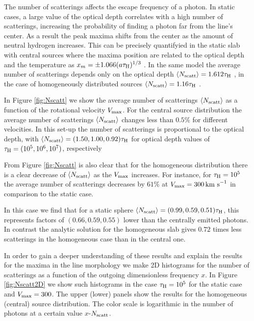 \documentclass{emulateapj}
\newcommand{\ly}{{\ifmmode{{\rm Ly}\alpha~}\else{Ly$\alpha$~}\fi}}
\newcommand{\kms}{{\ifmmode{{\mathrm{\,km\ s}^{-1}}}\else{\,km~s$^{-1}$}\fi}}
\begin{document}
The number of scatterings affects the escape frequency of a \ly photon.
In static cases, a large value of the optical depth correlates with a
high number of scatterings, increasing the probability of finding a
\ly photon far from the line's center. As a result the peak maxima
shifts from the center as the amount of neutral hydrogen
increases. This can be precisely quantifyied in the static slab
with central sources where the maxima position are related to
the optical depth and the temperature as $x_{m}=\pm 1.066(a\tau_{\rm
  H})^{1/3}$ \citep{Harrington73}. In the same model the average
number of scatterings depends only on the optical depth $\langle
N_{\rm  scatt}\rangle=1.612\tau_{\rm   H}$
\citep{Adams72,Harrington73}, in the case of homogeneously distributed
sources $\langle N_{\rm   scatt}\rangle=1.16\tau_{\rm   H}$
\citep{Harrington73}.   



In Figure \ref{fig:Nscatt} we show the average number of scatterings
$\langle N_{\rm scatt}\rangle$ as a function of the rotational velocity
$V_{\rm max}$. For the central source distribution the average number of
scatterings $\langle N_{\rm   scatt}\rangle$ changes less than $0.5\%$
for different velocities. In this set-up the number of scatterings is
proportional to the optical depth, with $\langle N_{\rm
  scatt}\rangle= (1.50, 1.00, 0.92)\tau_{\rm   H}$ for optical depth
values of $\tau_{\rm H} = (10^{5}, 10^{6}, 10^{7})$, respectively


From Figure \ref{fig:Nscatt} is also clear that for the homogeneous
distribution there is a clear decrease of $\langle N_{\rm
  scatt}\rangle$ as the $V_{\rm max}$ increases. For instance, for
$\tau_{\rm H}=10^5$ the average number of scatterings decreases by
$61\%$ at $V_{\rm max}=300\kms$ in comparison to the static case.  

In this case we find that for a static sphere $\langle N_{\rm
  scatt}\rangle= (0.99, 0.59, 0.51)\tau_{\rm   H}$, this
represents factors of $(0.66, 0.59, 0.55)$ lower than the centrally
emitted photons. In contrast the analytic solution for the homogeneous
slab gives $0.72$ times less scatterings in the homogeneous case than
in the central one. 

In order to gain a deeper understanding of these results and explain
the results for the maxima in the line morphology we make 2D
histograms for the number of scatterings as a function of the outgoing
dimensionless frequency $x$. In Figure \ref{fig:Nscatt2D} we show
such histograms in the case $\tau_{\rm H}=10^5$ for the
static case and $V_{\rm max}=300$\kms. The upper (lower) panels show the
results for the homogeneous (central) source distribution. The color
scale is logarithmic in the number of photons at a certain value
$x$-$N_{\rm scatt}$. 
\end{document}
